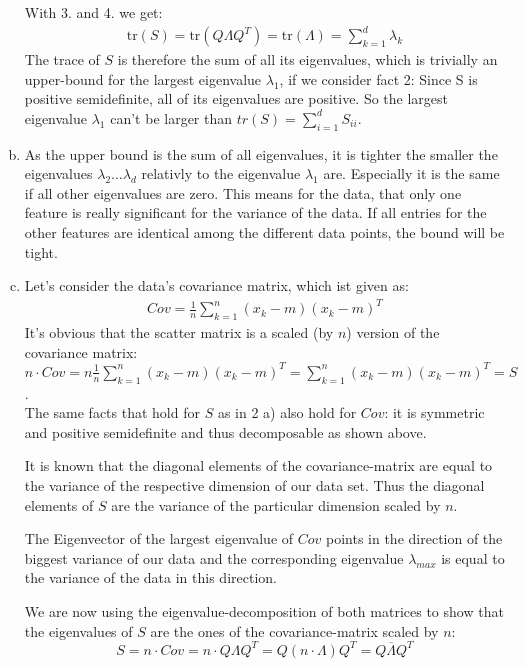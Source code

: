 \documentclass[10pt,a4paper]{article}
\newcommand{\tr}{\text{tr}}
\begin{document}
\begin{enumerate}[(a)]
\begin{enumerate}[1.]
\end{enumerate}
With 3. and 4. we get:
\begin{align*}
\tr(S) = \tr(Q\Lambda Q^T) = \tr(\Lambda) = \sum_{k = 1}^{d} \lambda_k
\end{align*}
The trace of $S$ is therefore the sum of all its eigenvalues, which is trivially an upper-bound for the largest eigenvalue $\lambda_1$, if we consider fact 2: Since S is positive semidefinite, all of its eigenvalues are positive. So the largest eigenvalue $\lambda_1$ can't be larger than $tr(S) = \sum^d_{i=1} S_{ii}$.
\item As the upper bound is the sum of all eigenvalues, it is tighter the smaller the eigenvalues $\lambda_2 \dots \lambda_d$ relativly to the eigenvalue $\lambda_1$ are. Especially it is the same if all other eigenvalues are zero. This means for the data, that only one feature is really significant for the variance of the data. If all entries for the other features are identical among the different data points, the bound will be tight.
\item
Let's consider the data's covariance matrix, which ist given as:
\begin{align*}
    Cov = \frac{1}{n} \sum_{k = 1}^{n} (x_k - m)(x_k - m)^T
\end{align*}
It's obvious that the scatter matrix is a scaled (by $n$) version of the covariance matrix: $n \cdot Cov = n \frac{1}{n} \sum_{k = 1}^{n} (x_k - m)(x_k - m)^T = \sum_{k = 1}^{n} (x_k - m)(x_k - m)^T = S$.\\

The same facts that hold for $S$ as in 2 a) also hold for $Cov$: it is symmetric and positive semidefinite and thus decomposable as shown above.

It is known that the diagonal elements of the covariance-matrix are equal to the variance of the respective dimension of our data set.
Thus the diagonal elements of $S$ are the variance of the particular dimension scaled by $n$.

The Eigenvector of the largest eigenvalue of $Cov$ points in the direction of the biggest variance of our data and the corresponding eigenvalue $\lambda_{max}$ is equal to the variance of the data in this direction.

We are now using the eigenvalue-decomposition of both matrices to show that the eigenvalues of $S$ are the ones of the covariance-matrix scaled by $n$:
$$S = n \cdot Cov = n \cdot Q\Lambda Q^T = Q(n \cdot \Lambda)Q^T = Q\overline{\Lambda}Q^T$$


\end{enumerate}
\end{document}
